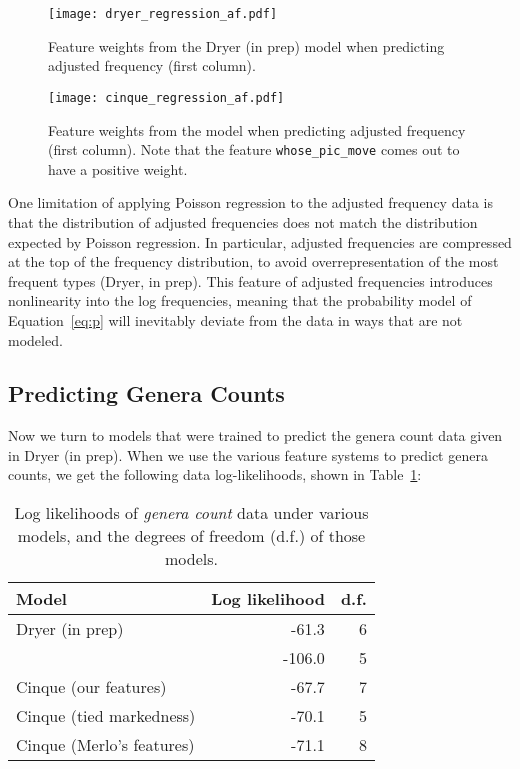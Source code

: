 \documentclass[11pt]{article}
\begin{document}
\begin{figure}[ht!]
  \centering
  \texttt{[image: dryer\_regression\_af.pdf]}
  \caption{Feature weights from the Dryer (in prep) model when predicting adjusted frequency (first column).}
  \label{fig:dryer-model}
\end{figure}

\begin{figure}[ht!]
  \centering
  \texttt{[image: cinque\_regression\_af.pdf]}
  \cprotect\caption{Feature weights from the \citet{cinque2005deriving} model when predicting adjusted frequency (first column). Note that the feature \verb+whose_pic_move+ comes out to have a positive weight.}
  \label{fig:cinque-model}
\end{figure}

One limitation of applying Poisson regression to the adjusted frequency data is that the distribution of adjusted frequencies does not match the distribution expected by Poisson regression. In particular, adjusted frequencies are compressed at the top of the frequency distribution, to avoid overrepresentation of the most frequent types (Dryer, in prep). This feature of adjusted frequencies introduces nonlinearity into the log frequencies, meaning that the probability model of Equation~\ref{eq:p} will inevitably deviate from the data in ways that are not modeled.

\subsection{Predicting Genera Counts}

Now we turn to models that were trained to predict the genera count data given in Dryer (in prep).
When we use the various feature systems to predict genera counts, we get the following data log-likelihoods, shown in Table~\ref{tab:genera-likelihoods}:

\begin{table}
  \centering
  \begin{tabular}{|l|r|r|}
    \hline
    Model & Log likelihood & d.f. \\
    \hline
    Dryer (in prep) & -61.3 & 6 \\
    \citet{cysouw2010dealing} & -106.0 & 5 \\
    Cinque (our features) & -67.7 & 7 \\
    Cinque (tied markedness) & -70.1 & 5 \\
    Cinque (Merlo's features) & -71.1 & 8 \\
    \hline 
  \end{tabular}
  \caption{Log likelihoods of \emph{genera count} data under various models, and the degrees of freedom (d.f.) of those models.}  
  \label{tab:genera-likelihoods}
\end{table}
\end{document}
